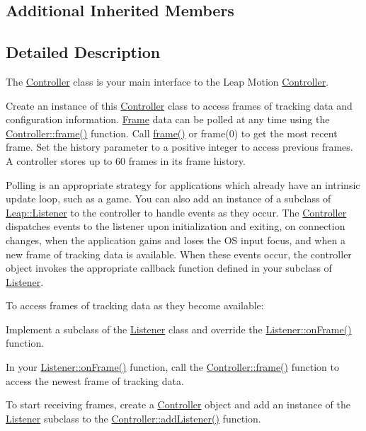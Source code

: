 \subsection*{Additional Inherited Members}


\subsection{Detailed Description}
The \hyperlink{class_leap_1_1_controller}{Controller} class is your main interface to the Leap Motion \hyperlink{class_leap_1_1_controller}{Controller}.

Create an instance of this \hyperlink{class_leap_1_1_controller}{Controller} class to access frames of tracking data and configuration information. \hyperlink{class_leap_1_1_frame}{Frame} data can be polled at any time using the \hyperlink{class_leap_1_1_controller_acb45e24fc2583045212f2cfec613f5b0}{Controller\+::frame()} function. Call \hyperlink{class_leap_1_1_controller_acb45e24fc2583045212f2cfec613f5b0}{frame()} or frame(0) to get the most recent frame. Set the history parameter to a positive integer to access previous frames. A controller stores up to 60 frames in its frame history.

Polling is an appropriate strategy for applications which already have an intrinsic update loop, such as a game. You can also add an instance of a subclass of \hyperlink{class_leap_1_1_listener}{Leap\+::\+Listener} to the controller to handle events as they occur. The \hyperlink{class_leap_1_1_controller}{Controller} dispatches events to the listener upon initialization and exiting, on connection changes, when the application gains and loses the OS input focus, and when a new frame of tracking data is available. When these events occur, the controller object invokes the appropriate callback function defined in your subclass of \hyperlink{class_leap_1_1_listener}{Listener}.

To access frames of tracking data as they become available\+:


\begin{DoxyEnumerate}
\item Implement a subclass of the \hyperlink{class_leap_1_1_listener}{Listener} class and override the \hyperlink{class_leap_1_1_listener_ab600421108bbc952d8f0f144384ca30f}{Listener\+::on\+Frame()} function.
\item In your \hyperlink{class_leap_1_1_listener_ab600421108bbc952d8f0f144384ca30f}{Listener\+::on\+Frame()} function, call the \hyperlink{class_leap_1_1_controller_acb45e24fc2583045212f2cfec613f5b0}{Controller\+::frame()} function to access the newest frame of tracking data.
\item To start receiving frames, create a \hyperlink{class_leap_1_1_controller}{Controller} object and add an instance of the \hyperlink{class_leap_1_1_listener}{Listener} subclass to the \hyperlink{class_leap_1_1_controller_a9b6318221593be63a0385748ca66974f}{Controller\+::add\+Listener()} function.
\end{DoxyEnumerate}

